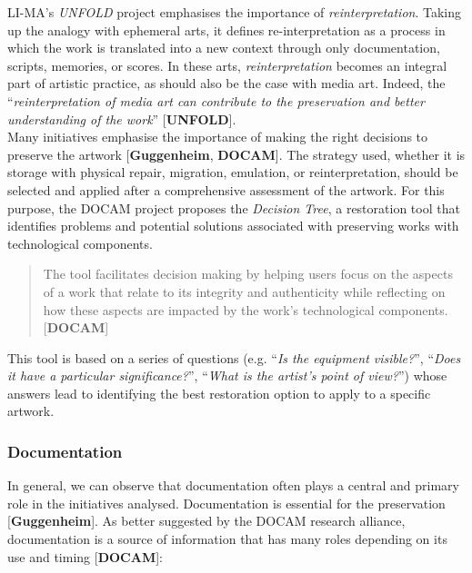 LI-MA’s \textit{UNFOLD} project emphasises the importance of \textit{reinterpretation}. Taking up the analogy with ephemeral arts, it defines re-interpretation as a process in which the work is translated into a new context through only documentation, scripts, memories, or scores.  In these arts, \textit{reinterpretation} becomes an integral part of artistic practice, as should also be the case with media art. Indeed, the ``\textit{reinterpretation of media art can contribute to the preservation and better understanding of the work}'' [\textbf{UNFOLD}].\\
Many initiatives emphasise the importance of making the right decisions to preserve the artwork [\textbf{Guggenheim}, \textbf{DOCAM}]. The strategy used, whether it is storage with physical repair, migration, emulation, or reinterpretation, should be selected and applied after a comprehensive assessment of the artwork. For this purpose, the DOCAM project proposes the \textit{Decision Tree}, a restoration tool that identifies problems and potential solutions associated with preserving works with technological components.\\
\begin{quote}
    The tool facilitates decision making by helping users focus on the aspects of a work that relate to its integrity and authenticity while reflecting on how these aspects are impacted by the work’s technological components. 
    [\textbf{DOCAM}]
\end{quote}

This tool is based on a series of questions (e.g. ``\textit{Is the equipment visible?}'',  ``\textit{Does it have a particular significance?}'', ``\textit{What is the artist’s point of view?}'') whose answers lead to identifying the best restoration option to apply to a specific artwork.

\subsubsection{Documentation}
In general, we can observe that documentation often plays a central and primary role in the initiatives analysed.  Documentation is essential for the preservation [\textbf{Guggenheim}]. As better suggested by the DOCAM research alliance, documentation is a source of information that has many roles depending on its use and timing [\textbf{DOCAM}]:

